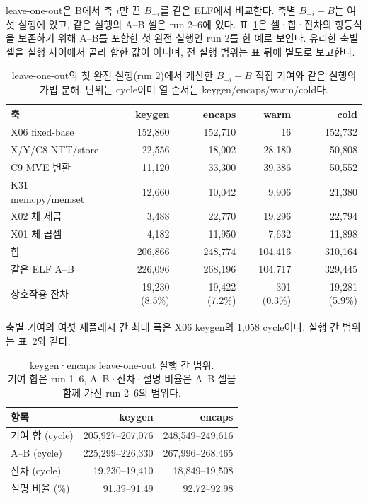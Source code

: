 \documentclass[runningheads,orivec]{llncs}
\begin{document}
leave-one-out은 B에서 축 $i$만 끈 $B_{-i}$를 같은 ELF에서 비교한다. 축별
$B_{-i}-B$는 여섯 실행에 있고, 같은 실행의 A--B 셀은 run 2--6에 있다.
표~\ref{tab:attribution}은 셀·합·잔차의 항등식을 보존하기 위해 A--B를 포함한 첫 완전
실행인 run 2를 한 예로 보인다. 유리한 축별 셀을 실행 사이에서 골라 합한 값이 아니며,
전 실행 범위는 표 뒤에 별도로 보고한다.

\begin{table}[H]\centering\footnotesize
\caption{leave-one-out의 첫 완전 실행(run 2)에서 계산한 $B_{-i}-B$ 직접 기여와
같은 실행의 가법 분해. 단위는 cycle이며 열 순서는 keygen/encaps/warm/cold다.}
\label{tab:attribution}
\renewcommand{\arraystretch}{1.05}
\begin{tabular}{lrrrr}\toprule
축 & keygen & encaps & warm & cold\\\midrule
X06 fixed-base & 152,860 & 152,710 & 16 & 152,732\\
X/Y/C8 NTT/store & 22,556 & 18,002 & 28,180 & 50,808\\
C9 MVE 변환 & 11,120 & 33,300 & 39,386 & 50,552\\
K31 memcpy/memset & 12,660 & 10,042 & 9,906 & 21,380\\
X02 체 제곱 & 3,488 & 22,770 & 19,296 & 22,794\\
X01 체 곱셈 & 4,182 & 11,950 & 7,632 & 11,898\\\midrule
합 & 206,866 & 248,774 & 104,416 & 310,164\\
같은 ELF A--B & 226,096 & 268,196 & 104,717 & 329,445\\
상호작용 잔차 & 19,230 (8.5\%) & 19,422 (7.2\%) & 301 (0.3\%) & 19,281 (5.9\%)\\\bottomrule
\end{tabular}
\end{table}
\FloatBarrier

축별 기여의 여섯 재플래시 간 최대 폭은 X06 keygen의 1,058 cycle이다. 실행 간 범위는
표~\ref{tab:attribution-ranges}와 같다.

\begin{table}[H]\centering\footnotesize
\caption{keygen·encaps leave-one-out 실행 간 범위.\protect\\ 기여 합은 run 1--6,
A--B·잔차·설명 비율은 A--B 셀을 함께 가진 run 2--6의 범위다.}
\label{tab:attribution-ranges}
\renewcommand{\arraystretch}{1.05}
\begin{tabular}{lrr}\toprule
항목 & keygen & encaps\\\midrule
기여 합 (cycle) & 205,927--207,076 & 248,549--249,616\\
A--B (cycle) & 225,299--226,330 & 267,996--268,465\\
잔차 (cycle) & 19,230--19,410 & 18,849--19,508\\
설명 비율 (\%) & 91.39--91.49 & 92.72--92.98\\\bottomrule
\end{tabular}
\end{table}
\end{document}
